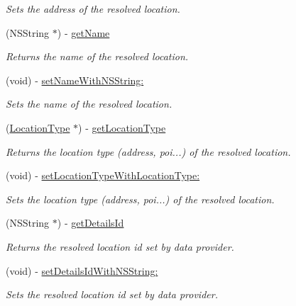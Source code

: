 \begin{DoxyCompactItemize}
\begin{DoxyCompactList}\small\item\em Sets the address of the resolved location. \end{DoxyCompactList}\item 
(N\+S\+String $\ast$) -\/ \hyperlink{interface_resolved_location_a72ca3dbdb5c80f27d5207bc1f7943c0a}{get\+Name}
\begin{DoxyCompactList}\small\item\em Returns the name of the resolved location. \end{DoxyCompactList}\item 
(void) -\/ \hyperlink{interface_resolved_location_af9a3832c0433bfa071aca060fc856435}{set\+Name\+With\+N\+S\+String\+:}
\begin{DoxyCompactList}\small\item\em Sets the name of the resolved location. \end{DoxyCompactList}\item 
(\hyperlink{interface_location_type}{Location\+Type} $\ast$) -\/ \hyperlink{interface_resolved_location_a50fddfcd9016238af0b2e953069e7189}{get\+Location\+Type}
\begin{DoxyCompactList}\small\item\em Returns the location type (address, poi...) of the resolved location. \end{DoxyCompactList}\item 
(void) -\/ \hyperlink{interface_resolved_location_a6ac66b81ebe46659395486dbfbf495a0}{set\+Location\+Type\+With\+Location\+Type\+:}
\begin{DoxyCompactList}\small\item\em Sets the location type (address, poi...) of the resolved location. \end{DoxyCompactList}\item 
(N\+S\+String $\ast$) -\/ \hyperlink{interface_resolved_location_a984015f39e03cafcc85add64290f1328}{get\+Details\+Id}
\begin{DoxyCompactList}\small\item\em Returns the resolved location id set by data provider. \end{DoxyCompactList}\item 
(void) -\/ \hyperlink{interface_resolved_location_a06a18d7dd7dd15c657012c34cac8baf4}{set\+Details\+Id\+With\+N\+S\+String\+:}
\begin{DoxyCompactList}\small\item\em Sets the resolved location id set by data provider. \end{DoxyCompactList}\item 

\end{DoxyCompactItemize}
